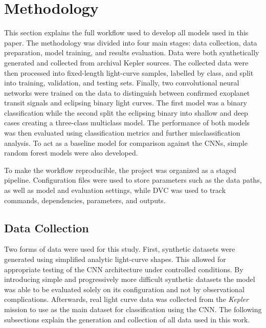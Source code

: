 \section{Methodology}

This section explains the full workflow used to develop all models used in this paper. The methodology was divided into four main stages: data collection, data preparation, model training, and results evaluation. Data were both synthetically generated and collected from archival Kepler sources. The collected data were then processed into fixed-length light-curve samples, labelled by class, and split into training, validation, and testing sets. Finally, two convolutional neural networks were trained on the data to distinguish between confirmed exoplanet transit signals and eclipsing binary light curves. The first model was a binary classification while the second split the eclipsing binary into shallow and deep cases creating a three-class multiclass model. The performance of both models was then evaluated using classification metrics and further misclassification analysis. To act as a baseline model for comparison against the CNNs, simple random forest models were also developed. 

To make the workflow reproducible, the project was organized as a staged pipeline. Configuration files were used to store parameters such as the data paths, as well as model and evaluation settings, while DVC was used to track commands, dependencies, parameters, and outputs.

\subsection{Data Collection}

Two forms of data were used for this study. First, synthetic datasets were generated using simplified analytic light-curve shapes. This allowed for appropriate testing of the CNN architecture under controlled conditions. By introducing simple and progressively more difficult synthetic datasets the model was able to be evaluated solely on its configuration and not by observational complications. Afterwards, real light curve data was collected from the \textit{Kepler} mission to use as the main dataset for classification using the CNN. The following subsections explain the generation and collection of all data used in this work.

